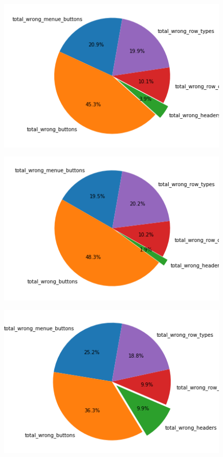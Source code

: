 \documentclass[pdftex,a4paper,halfparskip, article]{scrartcl}
\begin{document}
\begin{figure}
\centering
\begin{minipage}{.33\textwidth}
  \centering
  \includegraphics[width=1\linewidth]{predictions_bin13_total_error_types_pie_chart}
  \label{fig:fehler_gesamt_bin13}
\end{minipage}%
\begin{minipage}{.33\textwidth}
  \centering
  \includegraphics[width=1\linewidth]{predictions_bin13_excluded_p80_error_types_pie_chart}
  \label{fig:fehler_beste80_bin13}
\end{minipage}
\begin{minipage}{.33\textwidth}
  \centering
   \includegraphics[width=1\linewidth]{predictions_bin13_p80_error_types_pie_chart}

\end{minipage}
\end{figure}
\end{document}
